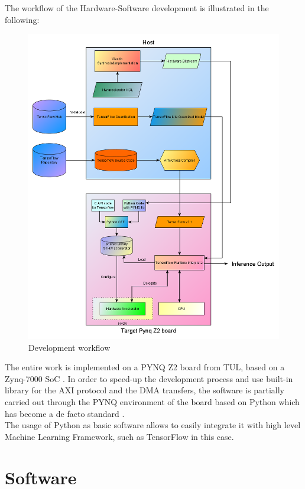 \newpage
The workflow of the Hardware-Software development is illustrated in the following:
\begin{figure}[!htbp]
\centering
\captionsetup{justification=centering}
\includegraphics[scale=0.5]{./figure/workflow.png}
\caption{Development workflow}
\label{fig:workflow}
\end{figure}

\newpage
The entire work is implemented on a PYNQ Z2 board from TUL, based on a Zynq-7000 SoC \cite{paper:31}. In order to speed-up the development process and use built-in library for the AXI protocol and the DMA transfers, the software is partially carried out through the PYNQ environment of the board \cite{WEBSITE:2} based on Python which has become a de facto standard \cite{paper:37}. \\
The usage of Python as basic software allows to easily integrate it with high level Machine Learning Framework, such as TensorFlow in this case. 
\newpage
\section{Software}

